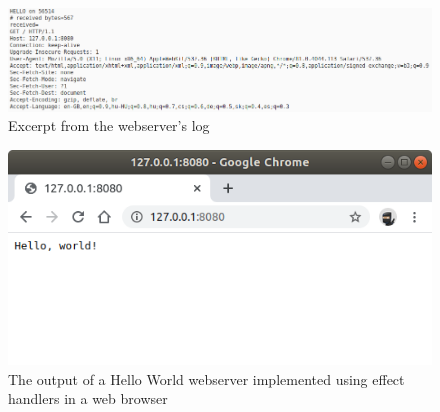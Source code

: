 \begin{figure}[h]
    \centering
    \includegraphics[height=.18\textheight]{screenshots/webserver_log.png}
    
    \caption{Excerpt from the webserver's log}
    \label{fig:app-screenshot-webserver-log}
\end{figure}

\begin{figure}[h]
    \centering
    \includegraphics[height=.2\textheight]{screenshots/webserver_hello_world.png}

    \caption{The output of a Hello World webserver implemented using effect handlers in a web browser}
    \label{fig:app-screenshot-webserver-hello-world}

\end{figure}